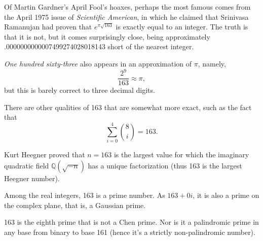 \documentclass[12pt]{article}
\begin{document}
Of Martin Gardner's April Fool's hoaxes, perhaps the most famous comes from the April 1975 issue of {\it Scientific American}, in which he claimed that Srinivasa Ramanujan had proven that $e^{\pi\sqrt{163}}$ is exactly equal to an integer. The truth is that it is not, but it comes surprisingly close, being approximately .0000000000007499274028018143 short of the nearest integer.

{\em One hundred sixty-three} also appears in an approximation of $\pi$, namely, $$\frac{2^9}{163} \approx \pi,$$ but this is barely correct to three decimal digits.

There are other qualities of 163 that are somewhat more exact, such as the fact that $$\sum_{i = 0}^4 {8 \choose i} = 163.$$

Kurt Heegner proved that $n = 163$ is the largest value for which the imaginary quadratic field $\mathbb{Q}(\sqrt{-n})$ has a unique factorization (thus 163 is the largest Heegner number).

Among the real integers, 163 is a prime number. As $163 + 0i$, it is also a prime on the complex plane, that is, a Gaussian prime.

163 is the eighth prime that is not a Chen prime. Nor is it a palindromic prime in any base from binary to base 161 (hence it's a strictly non-palindromic number).


\end{document}
